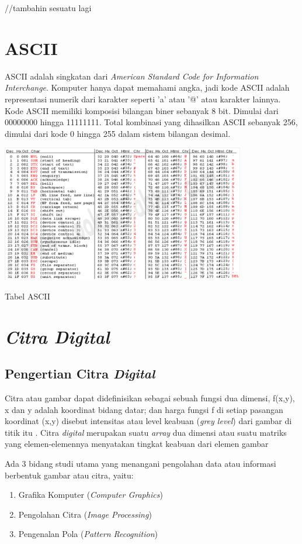 //tambahin sesuatu lagi

\section{ASCII}
ASCII adalah singkatan dari \emph{American Standard Code for Information Interchange}. Komputer hanya dapat memahami angka, jadi kode ASCII adalah representasi numerik dari karakter seperti 'a' atau '@' atau karakter lainnya. Kode ASCII memiliki komposisi bilangan biner sebanyak 8 bit. Dimulai dari 00000000 hingga 11111111. Total kombinasi yang dihasilkan ASCII sebanyak 256, dimulai dari kode 0 hingga 255 dalam sistem bilangan desimal. \cite{ascii}
\begin{table}[H]
	\centering
	\includegraphics[width=0.8\textwidth]{gambar/table_ascii}
	\caption{Tabel ASCII}
	\label{tabel_ascii}
\end{table}

\section{\emph{Citra Digital}}
	\subsection{Pengertian Citra \emph{Digital}}
	Citra atau gambar dapat didefinisikan sebagai sebuah fungsi dua dimensi, f(x,y), x dan y adalah koordinat bidang datar; dan harga fungsi f di setiap pasangan koordinat (x,y) disebut intensitas atau level keabuan (\emph{grey level}) dari gambar di titik itu \cite{hermawati}. Citra \emph{digital} merupakan suatu \emph{array} dua dimensi atau suatu matriks yang elemen-elemennya menyatakan tingkat keabuan dari elemen gambar \cite{arymurthy} 
	
	Ada 3 bidang studi utama yang menangani pengolahan data atau informasi berbentuk gambar atau citra, yaitu:
	\begin{enumerate}
		\item Grafika Komputer (\emph{Computer Graphics})
		\item Pengolahan Citra (\emph{Image Processing})
		\item Pengenalan Pola (\emph{Pattern Recognition})
	\end{enumerate}
	
